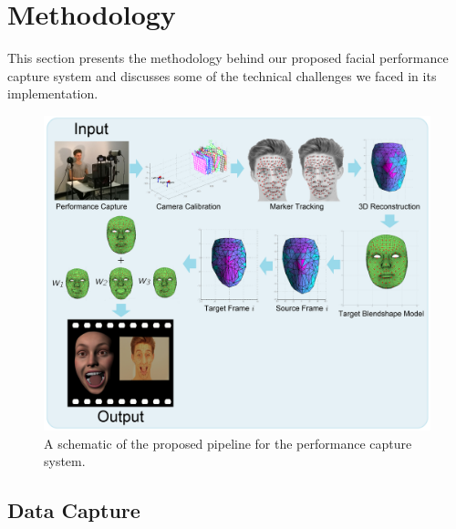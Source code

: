 \chapter{Methodology}
\label{sec:methods}

This section presents the methodology behind our proposed facial performance capture system and discusses some of the technical challenges we faced in its implementation.

\begin{figure}[htbp!]
\centering
\includegraphics[width=\textwidth]{img/pipeline1}
	\caption{A schematic of the proposed pipeline for the performance capture system.}
	\label{fig:pipeline1}
\end{figure}

\section{Data Capture} \label{sec:datacapture}

